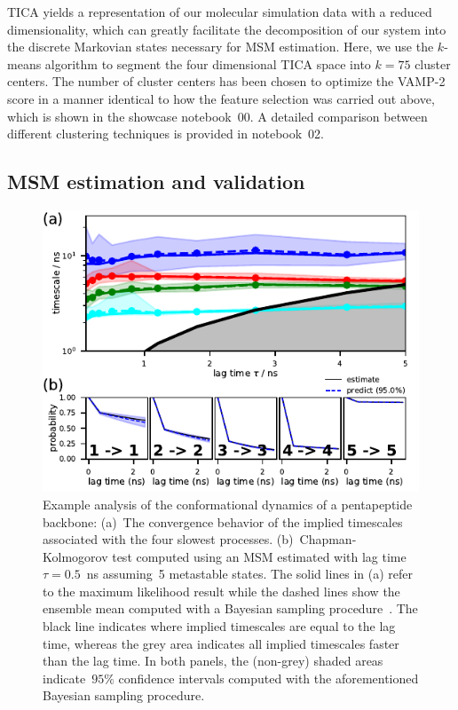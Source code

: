 \documentclass[9pt,tutorial]{livecoms}
\begin{document}
TICA yields a representation of our molecular simulation data with a reduced dimensionality,
which can greatly facilitate the decomposition of our system into the discrete Markovian states necessary for MSM estimation.
Here, we use the $k$-means algorithm to segment the four dimensional TICA space into $k=75$ cluster centers.
The number of cluster centers has been chosen to optimize the VAMP-2 score in a manner identical to how the feature selection was carried out above,
which is shown in the showcase notebook~00.
A detailed comparison between different clustering techniques is provided in notebook~02.

\subsection{MSM estimation and validation}

\begin{figure}
\includegraphics{figure_4}
\caption{Example analysis of the conformational dynamics of a pentapeptide backbone:
(a)~The convergence behavior of the implied timescales associated with the four slowest processes.
(b)~Chapman-Kolmogorov test computed using an MSM estimated with lag time $\tau=0.5$~ns assuming~5 metastable states.
The solid lines in (a) refer to the maximum likelihood result while the dashed lines show the ensemble mean computed with a Bayesian sampling procedure~\cite{ben-rev-msm}.
The black line indicates where implied timescales are equal to the lag time,
whereas the grey area indicates all implied timescales faster than the lag time.
In both panels, the (non-grey) shaded areas indicate~$95\%$ confidence intervals computed with the aforementioned Bayesian sampling procedure.}
\label{fig:its-and-ck}
\end{figure}
\end{document}
